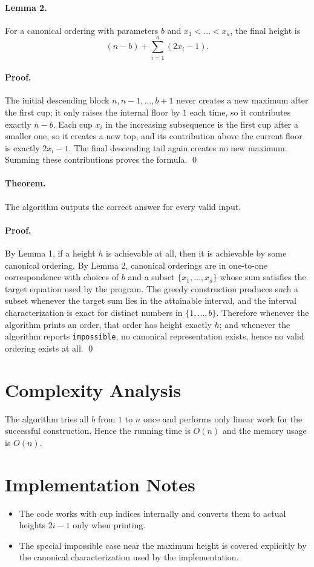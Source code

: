 \documentclass[11pt]{article}
\begin{document}
\paragraph{Lemma 2.}
For a canonical ordering with parameters $b$ and $x_1<\dots<x_a$, the final height is
\[
(n-b)+\sum_{i=1}^{a}(2x_i-1).
\]

\paragraph{Proof.}
The initial descending block $n,n-1,\dots,b+1$ never creates a new maximum after the first cup; it only
raises the internal floor by $1$ each time, so it contributes exactly $n-b$.
Each cup $x_i$ in the increasing subsequence is the first cup after a smaller one, so it creates a new top,
and its contribution above the current floor is exactly $2x_i-1$.
The final descending tail again creates no new maximum. Summing these contributions proves the
formula. \qed

\paragraph{Theorem.}
The algorithm outputs the correct answer for every valid input.

\paragraph{Proof.}
By Lemma 1, if a height $h$ is achievable at all, then it is achievable by some canonical ordering.
By Lemma 2, canonical orderings are in one-to-one correspondence with choices of $b$ and a subset
$\{x_1,\dots,x_a\}$ whose sum satisfies the target equation used by the program.
The greedy construction produces such a subset whenever the target sum lies in the attainable interval,
and the interval characterization is exact for distinct numbers in $\{1,\dots,b\}$.
Therefore whenever the algorithm prints an order, that order has height exactly $h$; and whenever the
algorithm reports \texttt{impossible}, no canonical representation exists, hence no valid ordering exists at
all. \qed

\section*{Complexity Analysis}

The algorithm tries all $b$ from $1$ to $n$ once and performs only linear work for the successful
construction. Hence the running time is $O(n)$ and the memory usage is $O(n)$.

\section*{Implementation Notes}

\begin{itemize}[leftmargin=*]
    \item The code works with cup indices internally and converts them to actual heights $2i-1$ only when
    printing.
    \item The special impossible case near the maximum height is covered explicitly by the canonical
    characterization used by the implementation.
\end{itemize}
\end{document}

